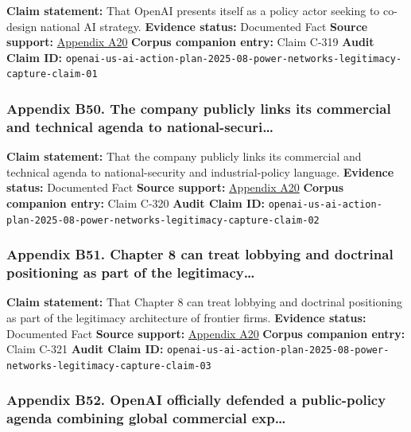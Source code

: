 \documentclass[
  american,
  11pt,
  letterpaper,
]{article}
\begin{document}
\textbf{Claim statement:} That OpenAI presents itself as a policy actor
seeking to co-design national AI strategy. \textbf{Evidence status:}
Documented Fact \textbf{Source support:}
\hyperref[ch-08-appendix-a20-openais-proposals-for-the-us-ai-action-plan]{Appendix
A20} \textbf{Corpus companion entry:} Claim C-319 \textbf{Audit Claim
ID:}
\texttt{openai-us-ai-action-plan-2025-08-power-networks-legitimacy-capture-claim-01}

\subsubsection{Appendix B50. The company publicly links its commercial
and technical agenda to
national-securi\ldots{}}\label{ch-08-appendix-b50-the-company-publicly-links-its-commercial-and-technical-agenda-to-national-securi}

\textbf{Claim statement:} That the company publicly links its commercial
and technical agenda to national-security and industrial-policy
language. \textbf{Evidence status:} Documented Fact \textbf{Source
support:}
\hyperref[ch-08-appendix-a20-openais-proposals-for-the-us-ai-action-plan]{Appendix
A20} \textbf{Corpus companion entry:} Claim C-320 \textbf{Audit Claim
ID:}
\texttt{openai-us-ai-action-plan-2025-08-power-networks-legitimacy-capture-claim-02}

\subsubsection{Appendix B51. Chapter 8 can treat lobbying and doctrinal
positioning as part of the
legitimacy\ldots{}}\label{ch-08-appendix-b51-chapter-8-can-treat-lobbying-and-doctrinal-positioning-as-part-of-the-legitimacy}

\textbf{Claim statement:} That Chapter 8 can treat lobbying and
doctrinal positioning as part of the legitimacy architecture of frontier
firms. \textbf{Evidence status:} Documented Fact \textbf{Source
support:}
\hyperref[ch-08-appendix-a20-openais-proposals-for-the-us-ai-action-plan]{Appendix
A20} \textbf{Corpus companion entry:} Claim C-321 \textbf{Audit Claim
ID:}
\texttt{openai-us-ai-action-plan-2025-08-power-networks-legitimacy-capture-claim-03}

\subsubsection{Appendix B52. OpenAI officially defended a public-policy
agenda combining global commercial
exp\ldots{}}\label{ch-08-appendix-b52-openai-officially-defended-a-public-policy-agenda-combining-global-commercial-exp}
\end{document}
